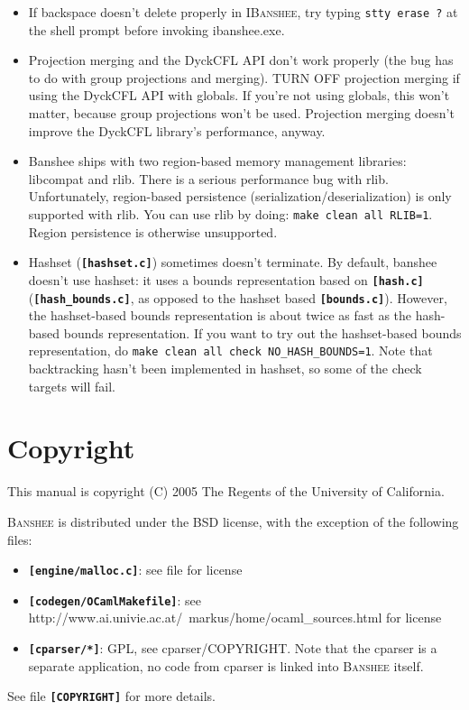 \documentclass[10pt]{article}
\newcommand{\banshee}{\textsc{Banshee}}
\newcommand{\ibanshee}{\textsc{IBanshee}}
\newcommand{\file}[1]{\texttt{\textbf{[#1]}}}
\begin{document}
\begin{itemize}

\item If backspace doesn't delete properly in \ibanshee{}, try typing
  \texttt{stty erase ?} at the shell prompt before invoking
  ibanshee.exe.

\item Projection merging and the DyckCFL API don't work properly (the
  bug has to do with group projections and merging). TURN OFF
  projection merging if using the DyckCFL API with globals. If you're
  not using globals, this won't matter, because group projections
  won't be used. Projection merging doesn't improve the DyckCFL
  library's performance, anyway.

\item Banshee ships with two region-based memory management libraries:
  libcompat and rlib. There is a serious performance bug with
  rlib. Unfortunately, region-based persistence
  (serialization/deserialization) is only supported with rlib. You can
  use rlib by doing: \texttt{make clean all RLIB=1}. Region
  persistence is otherwise unsupported.

\item Hashset (\file{hashset.c}) sometimes doesn't terminate. By
  default, banshee doesn't use hashset: it uses a bounds
  representation based on \file{hash.c} (\file{hash\_bounds.c}, as
  opposed to the hashset based \file{bounds.c}). However, the
  hashset-based bounds representation is about twice as fast as the
  hash-based bounds representation. If you want to try out the
  hashset-based bounds representation, do \texttt{make clean all check
    NO\_HASH\_BOUNDS=1}. Note that backtracking hasn't been
  implemented in hashset, so some of the check targets will fail.
\end{itemize}

\section{Copyright}
\label{app-copyright}

This manual is copyright (C) 2005 The Regents of the University of
California.

\banshee{} is distributed under the BSD license, with the exception of
the following files:

\begin{itemize}
\item \file{engine/malloc.c}: see file for license
\item \file{codegen/OCamlMakefile}: see
  http://www.ai.univie.ac.at/~markus/home/ocaml\_sources.html for
  license
\item \file{cparser/*}: GPL, see cparser/COPYRIGHT. Note that the
  cparser is a separate application, no code from cparser is linked
  into \banshee{} itself.
\end{itemize}

See file \file{COPYRIGHT} for more details.
\end{document}
